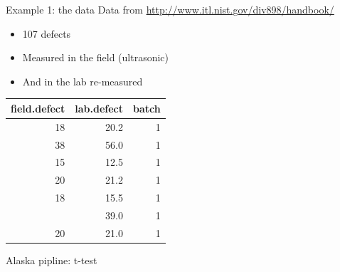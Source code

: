 \documentclass[
  ignorenonframetext,
]{beamer}
\newenvironment{Shaded}{\begin{snugshade}}{\end{snugshade}}
\newcommand{\AttributeTok}[1]{\textcolor[rgb]{0.13,0.29,0.53}{#1}}
\newcommand{\ConstantTok}[1]{\textcolor[rgb]{0.56,0.35,0.01}{#1}}
\newcommand{\FunctionTok}[1]{\textcolor[rgb]{0.13,0.29,0.53}{\textbf{#1}}}
\newcommand{\NormalTok}[1]{#1}
\newcommand{\SpecialCharTok}[1]{\textcolor[rgb]{0.81,0.36,0.00}{\textbf{#1}}}
\providecommand{\tightlist}{%
  \setlength{\itemsep}{0pt}\setlength{\parskip}{0pt}}
\begin{document}
\begin{frame}{Example 1: the data}
\label{example-1-the-data}
Data from \url{http://www.itl.nist.gov/div898/handbook/}

\begin{itemize}
\tightlist
\item
  107 defects
\item
  Measured in the field (ultrasonic)
\item
  And in the lab re-measured
\end{itemize}

\tiny

\begin{codebox}

\begin{table}
\centering
\begin{tabular}{rrr}
\toprule
field.defect & lab.defect & batch\\
\midrule
18 & 20.2 & 1\\
38 & 56.0 & 1\\
15 & 12.5 & 1\\
20 & 21.2 & 1\\
18 & 15.5 & 1\\
\addlinespace
36 & 39.0 & 1\\
20 & 21.0 & 1\\
\bottomrule
\end{tabular}
\end{table}

\end{codebox}

\normalsize
\end{frame}

\begin{frame}[fragile]{Alaska pipline: t-test}
\label{alaska-pipline-t-test}
\begin{codebox}

\begin{Shaded}
\end{Shaded}

\end{codebox}
\end{frame}
\end{document}
